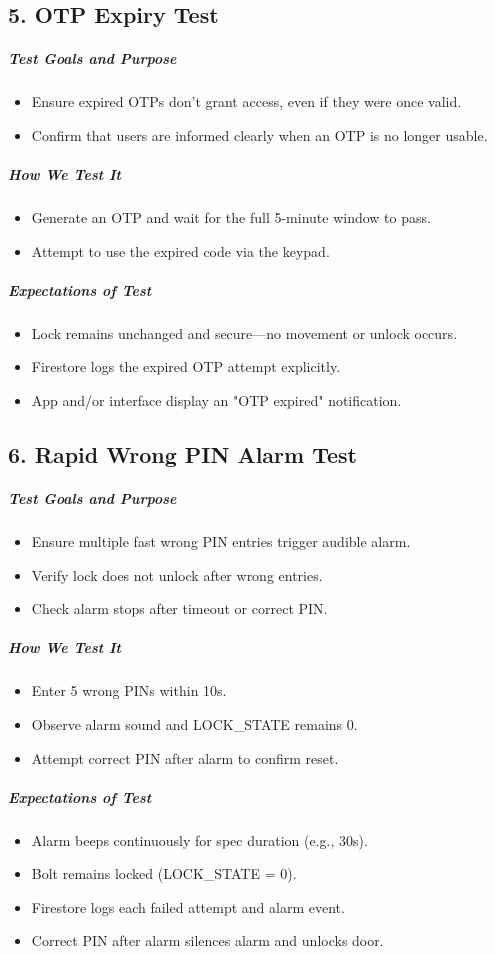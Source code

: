 \subsection*{5. OTP Expiry Test}
\subparagraph{Test Goals and Purpose}
\begin{itemize}
    \item Ensure expired OTPs don’t grant access, even if they were once valid.
    \item Confirm that users are informed clearly when an OTP is no longer usable.
\end{itemize}
\subparagraph{How We Test It}
\begin{itemize}
    \item Generate an OTP and wait for the full 5-minute window to pass.
    \item Attempt to use the expired code via the keypad.
\end{itemize}
\subparagraph{Expectations of Test}
\begin{itemize}
    \item Lock remains unchanged and secure—no movement or unlock occurs.
    \item Firestore logs the expired OTP attempt explicitly.
    \item App and/or interface display an "OTP expired" notification.
\end{itemize}

\subsection*{6. Rapid Wrong PIN Alarm Test}
\subparagraph{Test Goals and Purpose}
\begin{itemize}
    \item Ensure multiple fast wrong PIN entries trigger audible alarm.
    \item Verify lock does not unlock after wrong entries.
    \item Check alarm stops after timeout or correct PIN.
\end{itemize}
\subparagraph{How We Test It}
\begin{itemize}
    \item Enter 5 wrong PINs within 10s.
    \item Observe alarm sound and LOCK\_STATE remains 0.
    \item Attempt correct PIN after alarm to confirm reset.
\end{itemize}
\subparagraph{Expectations of Test}
\begin{itemize}
    \item Alarm beeps continuously for spec duration (e.g., 30s).
    \item Bolt remains locked (LOCK\_STATE = 0).
    \item Firestore logs each failed attempt and alarm event.
    \item Correct PIN after alarm silences alarm and unlocks door.
\end{itemize}

